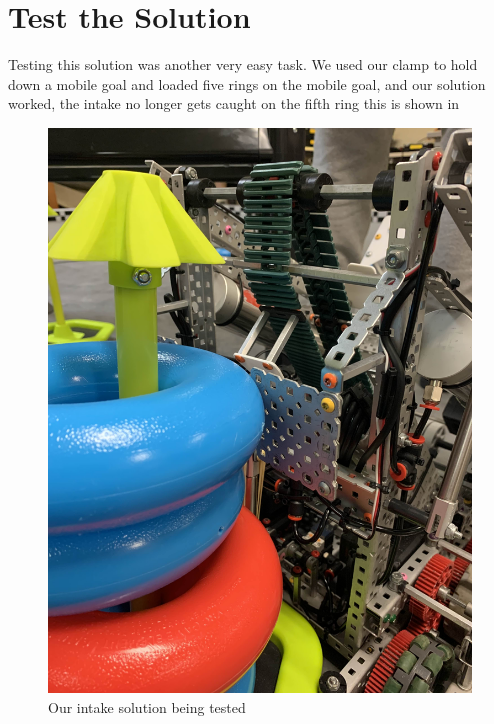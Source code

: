 \section*{Test the Solution}
Testing this solution was another very easy task. We used our clamp to hold down a mobile goal and loaded five rings on the mobile goal, and our solution worked, the intake no longer gets caught on the fifth ring this is shown in 
\begin{figure}[h!]
    \centering
    \includegraphics[width=0.5\linewidth]{images/Intake-test.jpg}
    \caption{Our intake solution being tested}
    \label{intake-test}
\end{figure}